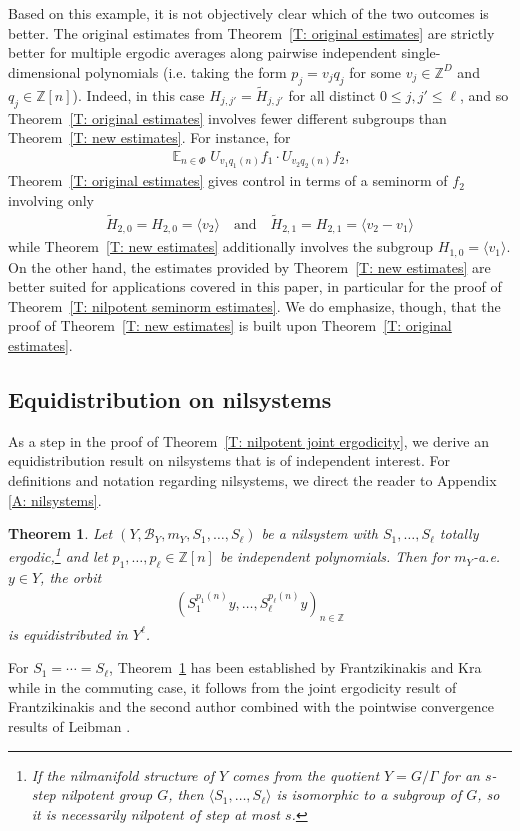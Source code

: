 \documentclass[11pt]{amsart}
\newtheorem{theorem}[lemma]{Theorem}
\theoremstyle{definition}
\DeclareMathOperator*{\E}{\mathbb{E}}
\newcommand{\Z}{{\mathbb Z}}
\newcommand{\CB}{{\mathcal B}}
\newcommand{\1}{{\mathbf{1}}}
\begin{document}
Based on this example, it is not objectively clear which of the two outcomes is better. The original estimates from Theorem~\ref{T: original estimates} are strictly better for multiple ergodic averages along pairwise independent single-dimensional polynomials (i.e. taking the form $p_j = v_j q_j$ for some $v_j\in\Z^D$ and $q_j\in\Z[n]$). Indeed, in this case $ H_{j,j'} =\tilde H_{j,j'}$ for all distinct $0\leq j,j'\leq \ell$, and so Theorem~\ref{T: original estimates} involves fewer different subgroups than Theorem~\ref{T: new estimates}. For instance, for
\begin{align*}
    \E_{n\in\Phi}U_{v_1q_1(n)}f_1\cdot U_{v_2q_2(n)}f_2,
\end{align*}
Theorem~\ref{T: original estimates} gives control in terms of a seminorm of $f_2$ involving only
\begin{align*}
    \tilde H_{2,0} = H_{2,0} = \langle v_2\rangle\quad \textrm{and}\quad \tilde H_{2,1} = H_{2,1} =\langle v_2-v_1\rangle
\end{align*}
while Theorem~\ref{T: new estimates} additionally involves the subgroup $H_{1,0} = \langle{v_1}\rangle$.
On the other hand, the estimates provided by Theorem~\ref{T: new estimates} are better suited for applications covered in this paper, in particular for the proof of Theorem~\ref{T: nilpotent seminorm estimates}. We do emphasize, though, that the proof of Theorem~\ref{T: new estimates} is built upon Theorem~\ref{T: original estimates}.


\subsection{Equidistribution on nilsystems}
As a step in the proof of Theorem~\ref{T: nilpotent joint ergodicity}, we derive an equidistribution result on nilsystems that is of independent interest. For definitions and notation regarding nilsystems, we direct the reader to Appendix \ref{A: nilsystems}.
\begin{theorem}\label{T: equidistribution}
    Let $(Y, \CB_Y, m_Y, S_1, \ldots, S_\ell)$ be a nilsystem with $S_1, \ldots, S_\ell$ totally ergodic,\footnote{If the nilmanifold structure of $Y$ comes from the quotient $Y=G/\Gamma$ for an $s$-step nilpotent group $G$, then $\langle S_1, \ldots, S_\ell\rangle$ is isomorphic to a subgroup of $G$, so it is necessarily nilpotent of step at most $s$.} and let $p_1, \ldots, p_\ell\in\Z[n]$ be independent polynomials.
    Then for $m_Y$-a.e. $y\in Y$, the orbit
    \begin{align*}%
        (S_1^{p_1(n)}y, \ldots, S_\ell^{p_\ell(n)}y)_{n\in\Z}
    \end{align*}
    is equidistributed in $Y^{\ell}$.
\end{theorem}
For $S_1 = \cdots = S_\ell$, Theorem~\ref{T: equidistribution} has been established by Frantzikinakis and Kra \cite{FrKr05} while in the commuting case, it follows from the joint ergodicity result of Frantzikinakis and the second author \cite{FrKu22a} combined with the pointwise convergence results of Leibman \cite{L05c, L05b}.
\end{document}

